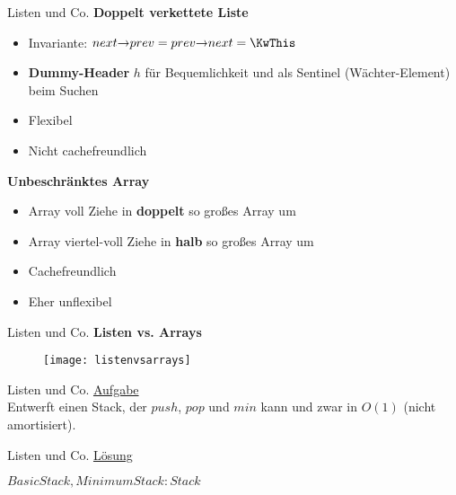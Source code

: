 \begin{frame}{Listen und Co.}
	\textbf{Doppelt verkettete Liste} \\[0,125cm]
	\begin{itemize}
		\item Invariante: $next \access prev = prev \access next = \KwThis$
		\item \textbf{Dummy-Header} $h$ für Bequemlichkeit und als Sentinel (Wächter-Element) beim Suchen
		\item[\Pros] Flexibel
		\item[\Cons] Nicht cachefreundlich
	\end{itemize}
	\textbf{Unbeschränktes Array} \\[0,125cm]
	\begin{itemize}
		\item Array voll \impl Ziehe in \textbf{doppelt} so großes Array um
		\item Array viertel-voll 
		\impl Ziehe in \textbf{halb} so großes Array um
		\item[\Pros] Cachefreundlich
		\item[\Cons] Eher unflexibel
	\end{itemize}
\end{frame}

\begin{frame}{Listen und Co.}
	\textbf{Listen vs. Arrays}
	\begin{figure}[htp]
		\centering
		\texttt{[image: listenvsarrays]}
	\end{figure}
\end{frame}

\begin{frame}{Listen und Co.}
	\underline{Aufgabe} \\
	Entwerft einen Stack, der $push$, $pop$ und $min$ kann und zwar in $O(1)$ (nicht amortisiert).
\end{frame}

\begin{frame}{Listen und Co.}
	\underline{Lösung} \\
	\begin{algorithm}[H]
		$BasicStack, MinimumStack: Stack$ \;
		\;
		\;
		\;
	\end{algorithm}
\end{frame}




